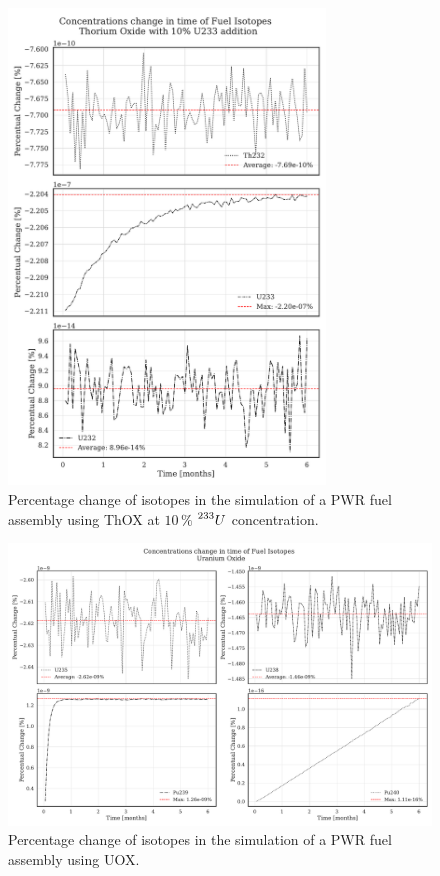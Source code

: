 \begin{figure}[h]
    \centering
    \includegraphics[width=0.75\textwidth, height=0.75\textheight]{Kap7/Figures_Kap7/percentual_change_th232_U233_10.pdf}
    \caption{Percentage change of isotopes in the simulation of a PWR fuel assembly using ThOX at \(10 \, \%\) \(\prescript{233}{}{U}\) concentration.}
    \label{fig:th_u233_10}
\end{figure}

\begin{figure}[h]
    \centering
    \includegraphics[width=1\textwidth]{Kap7/Figures_Kap7/percentual_change_uox.pdf}
    \caption{Percentage change of isotopes in the simulation of a PWR fuel assembly using UOX.}
    \label{fig:uo2}
\end{figure}

